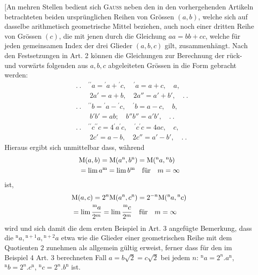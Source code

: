 [An mehren Stellen bedient sich \textsc{Gauss} neben den in den vorhergehenden Artikeln betrachteten beiden ursprünglichen Reihen von Grössen $(a,b)$, welche sich auf dasselbe arithmetisch geometrische Mittel beziehen, auch noch einer dritten Reihe von Grössen $(c)$, die mit jenen durch die Gleichung $aa=bb+cc$, welche für jeden gemeinsamen Index der drei Glieder $(a,b,c)$ gilt, zusammenhängt. Nach den Festsetzungen in Art. 2 können die Gleichungen zur Berechnung der rück- und vorwärts folgenden aus $a,b,c$ abgeleiteten Grössen in die Form gebracht werden:
\[
\begin{aligned}&.\ .\quad{}^{\prime\prime}a={}^\prime a+{}^\prime c,\quad{}^\prime a=a+c,\quad a,\\&\qquad2a'=a+b,\quad2a''=a'+b',\quad.\ .\\[9pt]&.\ .\quad{}^{\prime\prime}b={}^\prime a-{}^\prime c,\quad{}^\prime b=a-c,\quad b,\\&\qquad b'b'=ab; \quad b''b''=a'b',\quad.\ .\\[9pt]&.\ .\quad{}^{\prime\prime}c{}^{\prime\prime}c=4{}^\prime a{}^\prime c,\quad{}^\prime c{}^\prime c=4ac,\quad c,\\&\qquad2c'=a-b,\quad2c''=a'-b',\quad.\ .\end{aligned}
\]
Hieraus ergibt sich unmittelbar dass, während
\[
\begin{aligned}&\mathrm{M}(a,b)=\mathrm{M}(a^{\mathrm{n}},b^{\mathrm{n}})=\mathrm{M}({}^{\mathrm{n}}a,{}^{\mathrm{n}}b)\\&=\lim a^{\mathrm{m}}=\lim b^{\mathrm{m}}\quad\hbox{für}\quad m=\infty\end{aligned}
\]
ist,
\[
\begin{aligned}&\mathrm{M}(a,c)=2^n\mathrm{M}(a^{\mathrm{n}},c^{\mathrm{n}})=2^{-n}\mathrm{M}({}^{\mathrm{n}}a,{}^{\mathrm{n}}c)\\&=\lim\frac{{}^{\mathrm{m}}a}{2^m}=\lim\frac{{}^{\mathrm{m}}c}{2^m}\quad\hbox{für}\quad m=\infty\end{aligned}
\]
wird und sich damit die dem ersten Beispiel in Art. 3 angefügte Bemerkung, dass die ${}^{\mathrm{n}}a,{}^{\mathrm{n}+1}a,{}^{\mathrm{n}+2}a$ etwa wie die Glieder einer geometrischen Reihe mit dem Quotienten $2$ zunehmen als allgemein gültig erweist, ferner dass für den im Beispiel 4 Art. 3 berechneten Fall $a=b\surd2=c\surd2$ bei jedem $n$: ${}^{\mathrm{n}}a=2^n.a^{\mathrm{n}}$, ${}^{\mathrm{n}}b=2^n.c^{\mathrm{n}}$, ${}^{\mathrm{n}}c=2^n.b^{\mathrm{n}}$ ist.


